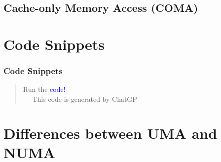 \documentclass[
	12pt, %
]{beamer}
\begin{document}

\subsection{Cache-only Memory Access (COMA)}












\section{Code Snippets}

\begin{frame}
	\frametitle{Code Snippets}
	
	\begin{quote}
		Run the \textcolor{blue}{code!}\\
		--- This code is generated by ChatGP
	\end{quote}
	
\end{frame}




\section{Differences between UMA and NUMA}
\end{document}
